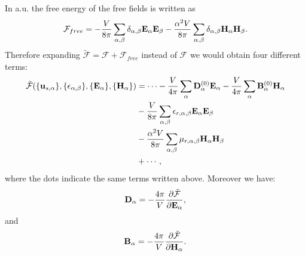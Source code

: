 \documentclass[12pt,a4paper]{article}
\begin{document}
{\color{web-blue} In a.u. the free energy of the 
free fields is written as
\begin{equation}
\mathcal{F}_{free}=-{V \over 8 \pi} \sum_{\alpha,\beta} 
\delta_{\alpha,\beta} {\bf E}_\alpha {\bf E}_\beta-
{\alpha^2 V \over 8 \pi} \sum_{\alpha,\beta} 
\delta_{\alpha,\beta} {\bf H}_\alpha {\bf H}_\beta.
\end{equation}
Therefore expanding $\mathcal{\tilde F} = \mathcal{F} + \mathcal{F}_{free}$
instead of $\mathcal{F}$ we would obtain four different terms:
\begin{align}
\mathcal{\tilde F}(\{{\bf u}_{s,\alpha}\}, \{\epsilon_{\alpha,\beta}\},
\{ {\bf E}_\alpha\}, \{{\bf H}_\alpha\})&= \cdots -
{V \over 4 \pi} \sum_{\alpha} {\bf D}^{(0)}_\alpha {\bf E}_\alpha - 
{V \over 4 \pi} \sum_{\alpha} {\bf B}^{(0)}_\alpha {\bf H}_\alpha \nonumber \\
&- {V\over 8 \pi} \sum_{\alpha,\beta} 
\epsilon_{r,\alpha,\beta}
{\bf E}_{\alpha}
{\bf E}_{\beta} \nonumber \\
&- {\alpha^2 V\over 8 \pi} \sum_{\alpha,\beta} 
\mu_{r,\alpha,\beta}
{\bf H}_{\alpha}
{\bf H}_{\beta} \nonumber \\
&+ \cdots,
\end{align}
where the dots indicate the same terms written above.
Moreover we have:
\begin{equation}
{\bf D}_\alpha = -{4\pi\over V} {\partial \mathcal{\tilde F} \over 
\partial {\bf E}_\alpha},
\end{equation}
and
\begin{equation}
{\bf B}_\alpha = -{4\pi\over V} {\partial \mathcal{\tilde F} \over 
\partial {\bf H}_\alpha}.
\end{equation}
}
\\
\end{document}
